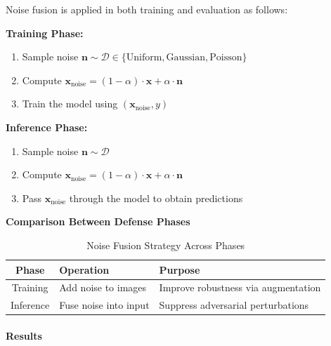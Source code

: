 \documentclass[../main.tex]{subfiles}
\begin{document}
Noise fusion is applied in both training and evaluation as follows:

\textbf{Training Phase:}
\begin{enumerate}
    \item Sample noise $\mathbf{n} \sim \mathcal{D} \in \{\text{Uniform}, \text{Gaussian}, \text{Poisson}\}$
    \item Compute $\mathbf{x}_{\text{noise}} = (1 - \alpha) \cdot \mathbf{x} + \alpha \cdot \mathbf{n}$
    \item Train the model using $(\mathbf{x}_{\text{noise}}, y)$
\end{enumerate}

\textbf{Inference Phase:}
\begin{enumerate}
    \item Sample noise $\mathbf{n} \sim \mathcal{D}$
    \item Compute $\mathbf{x}_{\text{noise}} = (1 - \alpha) \cdot \mathbf{x} + \alpha \cdot \mathbf{n}$
    \item Pass $\mathbf{x}_{\text{noise}}$ through the model to obtain predictions
\end{enumerate}

\textbf{Comparison Between Defense Phases}

\begin{table}[H]
\centering
\begin{tabular}{|c|l|l|}
\hline
\textbf{Phase} & \textbf{Operation} & \textbf{Purpose} \\
\hline
Training  & Add noise to images & Improve robustness via augmentation \\
Inference & Fuse noise into input & Suppress adversarial perturbations \\
\hline
\end{tabular}
\caption{Noise Fusion Strategy Across Phases}
\end{table}



\paragraph{Results}\mbox{}\\[1ex]
\end{document}
